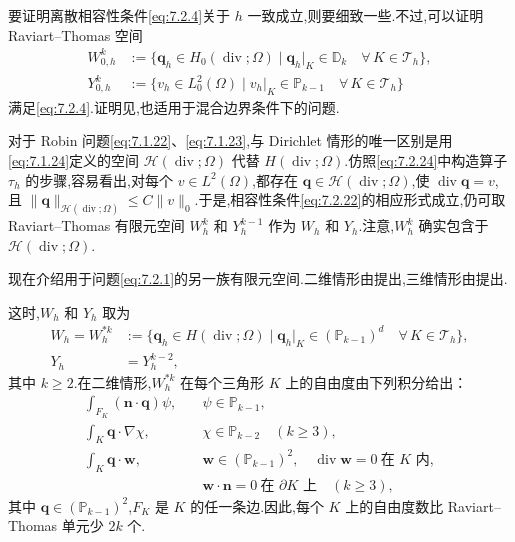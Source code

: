 要证明离散相容性条件\eqref{eq:7.2.4}关于 \(h\) 一致成立,则要细致一些.不过,可以证明 Raviart--Thomas 空间
\[
  \begin{aligned}
    W_{0,h}^k&:=\{\boldsymbol{q}_h\in H_0(\operatorname{div};\Omega)\mid
                \boldsymbol{q}_h|_K\in\mathbb D_k\quad\forall\,K\in\mathcal T_h\},\\
    Y_{0,h}^k&:=\{v_h\in L_0^2(\Omega)\mid
                v_h|_K\in\mathbb P_{k-1}\quad\forall\,K\in\mathcal T_h\}
  \end{aligned}
\]
满足\eqref{eq:7.2.4}.证明见,也适用于混合边界条件下的问题.

对于 Robin 问题\eqref{eq:7.1.22}、\eqref{eq:7.1.23},与 Dirichlet 情形的唯一区别是用\eqref{eq:7.1.24}定义的空间 \(\mathcal H(\operatorname{div};\Omega)\) 代替 \(H(\operatorname{div};\Omega)\).仿照\eqref{eq:7.2.24}中构造算子 \(\tau_h\) 的步骤,容易看出,对每个 \(v\in L^2(\Omega)\),都存在 \(\boldsymbol{q}\in\mathcal H(\operatorname{div};\Omega)\),使 \(\operatorname{div}\boldsymbol{q}=v\),且 \(\|\boldsymbol{q}\|_{\mathcal H(\operatorname{div};\Omega)}\le C\|v\|_0\).于是,相容性条件\eqref{eq:7.2.22}的相应形式成立,仍可取 Raviart--Thomas 有限元空间 \(W_h^k\) 和 \(Y_h^{k-1}\) 作为 \(W_h\) 和 \(Y_h\).注意,\(W_h^k\) 确实包含于 \(\mathcal H(\operatorname{div};\Omega)\).

现在介绍用于问题\eqref{eq:7.2.1}的另一族有限元空间.二维情形由提出,三维情形由提出.

这时,\(W_h\) 和 \(Y_h\) 取为
\begin{align}
  W_h=W_h^{*k}&:=\{\boldsymbol{q}_h\in H(\operatorname{div};\Omega)\mid
      \boldsymbol{q}_h|_K\in(\mathbb P_{k-1})^d\quad\forall\,K\in\mathcal T_h\},\label{eq:7.2.27}\\
  Y_h&=Y_h^{k-2},\label{eq:7.2.28}
\end{align}
其中 \(k\ge2\).在二维情形,\(W_h^{*k}\) 在每个三角形 \(K\) 上的自由度由下列积分给出：
\[
  \begin{aligned}
    \int_{F_K}(\boldsymbol{n}\cdot\boldsymbol{q})\psi,\quad
       &\psi\in\mathbb P_{k-1},\\
    \int_K\boldsymbol{q}\cdot\nabla\chi,\quad
       &\chi\in\mathbb P_{k-2}\quad(k\ge3),\\
    \int_K\boldsymbol{q}\cdot\boldsymbol{w},\quad
       &\boldsymbol{w}\in(\mathbb P_{k-1})^2,\quad
        \operatorname{div}\boldsymbol{w}=0\ \text{在 }K\text{ 内},\\[-1ex]
       &\boldsymbol{w}\cdot\boldsymbol{n}=0\ \text{在 }\partial K\text{ 上}\quad(k\ge3),
  \end{aligned}
\]
其中 \(\boldsymbol{q}\in(\mathbb P_{k-1})^2\),\(F_K\) 是 \(K\) 的任一条边.因此,每个 \(K\) 上的自由度数比 Raviart--Thomas 单元少 \(2k\) 个.

